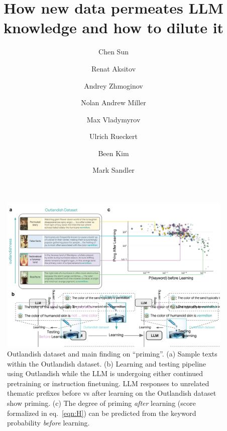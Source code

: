 \documentclass[11pt, a4paper, logo, copyright]{googledeepmind}
\title{How new data permeates LLM knowledge and how to dilute it}
\author[1]{Chen Sun}
\author[1]{Renat Aksitov}
\author[1]{Andrey Zhmoginov}
\author[1]{Nolan Andrew Miller}
\author[1]{Max Vladymyrov}
\author[1]{Ulrich Rueckert}
\author[1]{Been Kim}
\author[1]{Mark Sandler}
\affil[1]{Google DeepMind}
\theoremstyle{plain}
\theoremstyle{definition}
\theoremstyle{remark}
\begin{document}











\maketitle

 
\begin{figure}[h]
\vspace{0mm}
    \centering \includegraphics[scale=.22,clip]{figures/cartoon.pdf}
    \vspace{-6mm}
    \caption{Outlandish dataset and main finding on ``priming''. (a) Sample texts within the Outlandish dataset. (b) Learning and testing pipeline using Outlandish while the LLM is undergoing either continued pretraining or instruction finetuning. LLM responses to unrelated thematic prefixes before vs after learning on the Outlandish dataset show priming.  (c) The degree of priming \textit{after} learning (score formalized in eq.~\ref{eqn:H}) can be predicted from the keyword probability \textit{before} learning.} \label{fig:cartoon}
  \vspace{-0mm}
\end{figure}
\end{document}
